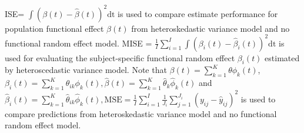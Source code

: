 ISE= $\int(\beta(t)-\hat{\beta}(t))^2 \mbox{dt}$ is used to compare estimate performance for population functional effect $\beta(t)$ from heteroskedastic variance model and no functional random effect model. MISE = $\frac{1}{I} \sum_{i=1}^{I} \int(\beta_i(t)-\hat{\beta}_i(t))^2 \mbox{dt}$ is used for evaluating the subject-specific functional random effect $\beta_i(t)$ estimated by heteroscedastic variance model. Note that ${\beta}(t) = \sum_{k=1}^{K} {\theta}{\phi}_k(t)$, ${\beta}_i(t) = \sum_{k=1}^{K} {\theta}_{ik}{\phi}_k(t), \hat{\beta}(t) = \sum_{k=1}^{K} \hat{\theta}_k\hat{\phi}_k(t)$
and $\hat{\beta}_i(t) = \sum_{k=1}^{K} \hat{\theta}_{ik}\hat{\phi}_k(t)\mathbin{,} \mbox{MSE}=\frac{1}{I} \sum_{i=1}^{I}\frac{1}{J_i} \sum_{j=1}^{J_i}(y_{ij}-\hat{y}_{ij})^2$ is used to compare predictions from heteroskedastic variance model and no functional random effect model.

